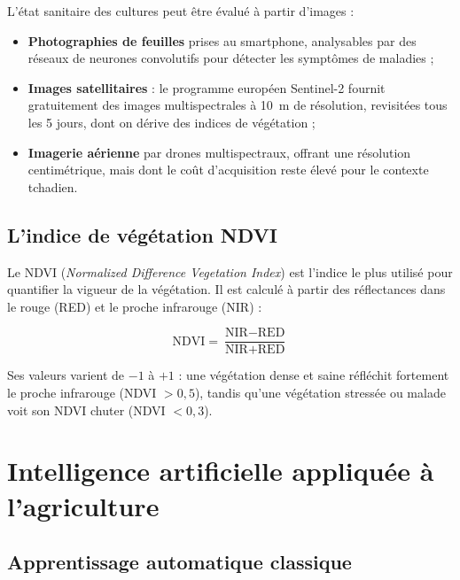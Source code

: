 L'état sanitaire des cultures peut être évalué à partir d'images :

\begin{itemize}[leftmargin=1.2cm]
	\item \textbf{Photographies de feuilles} prises au smartphone,
	analysables par des réseaux de neurones convolutifs pour
	détecter les symptômes de maladies
	\cite{mohanty2016deep} ;
	\item \textbf{Images satellitaires} : le programme européen
	Sentinel-2 \cite{sentinel2esa} fournit gratuitement des
	images multispectrales à 10~m de résolution, revisitées
	tous les 5 jours, dont on dérive des indices de
	végétation ;
	\item \textbf{Imagerie aérienne} par drones multispectraux,
	offrant une résolution centimétrique, mais dont le coût
	d'acquisition reste élevé pour le contexte tchadien.
\end{itemize}

\subsection{L'indice de végétation NDVI}

Le NDVI (\textit{Normalized Difference Vegetation Index})
\cite{rouse1974monitoring} est l'indice le plus utilisé pour
quantifier la vigueur de la végétation. Il est calculé à partir
des réflectances dans le rouge (RED) et le proche infrarouge
(NIR) :

\begin{equation}
	\text{NDVI} = \frac{\text{NIR} - \text{RED}}
	{\text{NIR} + \text{RED}}
	\label{eq:ndvi}
\end{equation}

Ses valeurs varient de $-1$ à $+1$ : une végétation dense et
saine réfléchit fortement le proche infrarouge (NDVI $> 0{,}5$),
tandis qu'une végétation stressée ou malade voit son NDVI chuter
(NDVI $< 0{,}3$).

\section{Intelligence artificielle appliquée à l'agriculture}
\label{sec:ia_agriculture}

\subsection{Apprentissage automatique classique}

